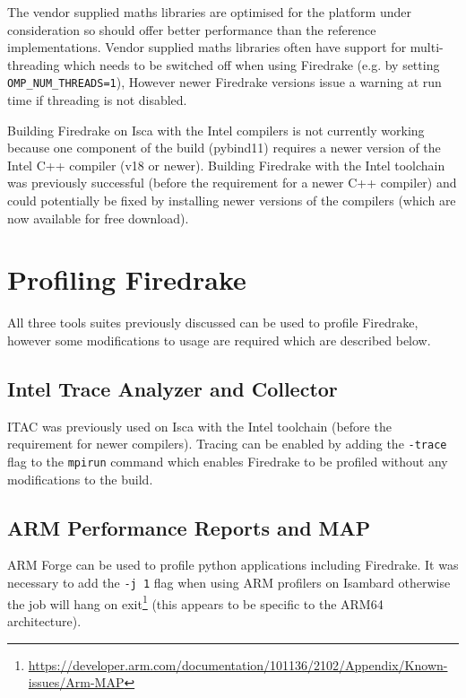 \documentclass[a4paper,titlepage]{article}
\begin{document}
The vendor supplied maths libraries are optimised for the platform under consideration so should offer better performance than the reference implementations. 
Vendor supplied maths libraries often have support for multi-threading which needs to be switched off when using Firedrake (e.g. by setting \verb+OMP_NUM_THREADS=1+), However newer Firedrake versions issue a warning at run time if threading is not disabled. 

Building Firedrake on Isca with the Intel compilers is not currently working because one component of the build (pybind11) requires a newer version of the Intel C++ compiler (v18 or newer). Building Firedrake with the Intel toolchain was previously successful (before the requirement for a newer C++ compiler) and could potentially be fixed by installing newer versions of the compilers (which are now available for free download).


\section{Profiling Firedrake}
\label{section:profiling_firedrake}

All three tools suites previously discussed can be used to profile Firedrake, however some modifications to usage are required which are described below.


\subsection{Intel Trace Analyzer and Collector}

ITAC was previously used on Isca with the Intel toolchain (before the requirement for newer compilers). Tracing can be enabled by adding the \verb+-trace+ flag to the \verb+mpirun+ command which enables Firedrake to be profiled without any modifications to the build. 


\subsection{ARM Performance Reports and MAP}

ARM Forge can be used to profile python applications including Firedrake. It was necessary to add the \verb+-j 1+ flag when using ARM profilers on Isambard otherwise the job will hang on exit\footnote{\url{https://developer.arm.com/documentation/101136/2102/Appendix/Known-issues/Arm-MAP}} (this appears to be specific to the ARM64 architecture).
\end{document}
